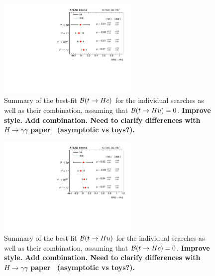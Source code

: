 \begin{figure}[t!]
\begin{center}
\includegraphics[width=0.6\textwidth]{figures/Combo/BestFit_Hc.pdf}
\caption{\small {Summary of the best-fit $\mathcal{B}(t\to Hc)$ for the individual searches as well as their combination,
assuming that $\mathcal{B}(t\to Hu)=0$. \textbf{Improve style. Add combination. Need to clarify differences with $H \to \gamma\gamma$ paper~\cite{Aaboud:2017mfd} (asymptotic vs toys?).}}}
\label{fig:summary_printnum_hc} 
\end{center}
\end{figure}
\begin{figure}[h!]
\begin{center}
\includegraphics[width=0.6\textwidth]{figures/Combo/BestFit_Hu.pdf}
\caption{\small {Summary of the best-fit $\mathcal{B}(t\to Hu)$ for the individual searches as well as their combination,
assuming that $\mathcal{B}(t\to Hc)=0$. \textbf{Improve style. Add combination. Need to clarify differences with $H \to \gamma\gamma$ paper~\cite{Aaboud:2017mfd} (asymptotic vs toys?).}}}
\label{fig:summary_printnum_hu} 
\end{center}
\end{figure}

